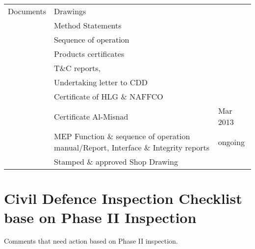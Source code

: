 {\begin{longtable}{p{2.3cm}p{4.2cm}p{4.2cm}}
Documents	&Drawings &\\
	& Method Statements &\ch \\
	& Sequence of operation &\ch \\
	& Products certificates &\ch \\
	& T\&C reports, &\\
	& Undertaking letter to CDD &\\
	& Certificate of HLG \& NAFFCO &\\
        & Certificate Al-Misnad              &\ch 9 Mar 2013\\
	&MEP Function \& sequence of operation manual/Report, Interface \& Integrity reports &ongoing\\
	&Stamped \& approved Shop Drawing &\ch \\
\bottomrule
\end{longtable}
}

\section{Civil Defence Inspection Checklist base on Phase II Inspection}

Comments that need action based on Phase II inspection.







